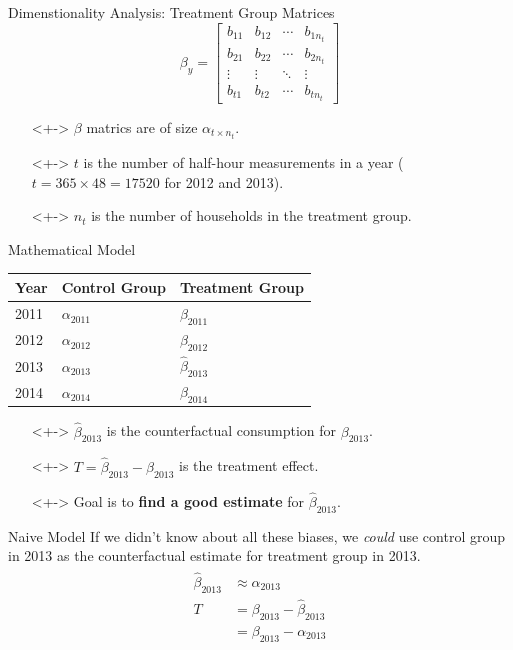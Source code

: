 \documentclass{beamer}
\begin{document}
\begin{frame}{Dimenstionality Analysis: Treatment Group Matrices}
  $$
  \beta_y = \left[\begin{array}{cccc}
  b_{11} & b_{12} & \cdots & b_{1 n_t} \\
  b_{21} & b_{22} & \cdots & b_{2 n_t} \\
  \vdots & \vdots & \ddots & \vdots \\
  b_{t 1} & b_{t 2} & \cdots & b_{t n_t}
  \end{array}\right]
  $$
  \begin{itemize}
  \item[]<+-> $\beta$ matrics are of size $\alpha_{t \times n_t}$.
  \item[]<+-> $t$ is the number of half-hour measurements in a year ($t = 365 \times 48 = 17520$ for 2012 and 2013).
  \item[]<+-> $n_t$ is the number of households in the treatment group. 
  \end{itemize}
\end{frame}

\begin{frame}{Mathematical Model}
  \begin{table}[h!]
  \centering
    \begin{tabular}{|p{3cm}|p{3.5cm}|p{3.5cm}|}
        \hline
        Year & Control Group & Treatment Group \\
        \hline
        2011 & $\alpha_{2011}$ & $\beta_{2011}$ \\
        2012 & $\alpha_{2012}$ & $\beta_{2012}$ \\
        2013 & $\alpha_{2013}$ & $\hat\beta_{2013}$ \\
        2014 & $\alpha_{2014}$ & $\beta_{2014}$ \\
        \hline
    \end{tabular}
  \end{table}
  \begin{itemize}
    \item[]<+-> $\hat\beta_{2013}$ is the counterfactual consumption for $\beta_{2013}$.
    \item[]<+-> $T = \hat\beta_{2013} - \beta_{2013}$ is the treatment effect.
    \item[]<+-> Goal is to \textbf{find a good estimate} for $\hat\beta_{2013}$.
  \end{itemize}
\end{frame}

\begin{frame}{Naive Model}
  If we didn't know about all these biases, we \textit{could} use control group in 2013 as the counterfactual estimate for treatment group in 2013.
  \begin{align}
    \begin{split}
      \hat\beta_{2013} & \approx \alpha_{2013} \\
      T & = \beta_{2013} - \hat\beta_{2013} \\
        & = \beta_{2013} - \alpha_{2013}
    \end{split}
  \end{align}
\end{frame}
\end{document}

